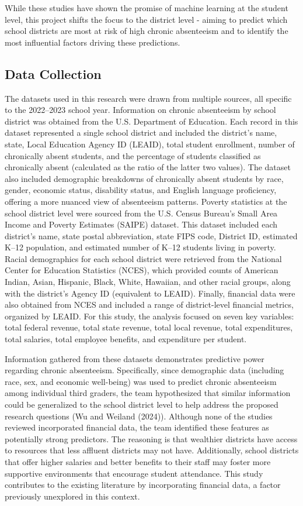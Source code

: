 \documentclass[
  11pt,
]{article}
\begin{document}
While these studies have shown the promise of machine learning at the
student level, this project shifts the focus to the district level -
aiming to predict which school districts are most at risk of high
chronic absenteeism and to identify the most influential factors driving
these predictions.

\subsection{Data Collection}\label{data-collection}

The datasets used in this research were drawn from multiple sources, all
specific to the 2022--2023 school year. Information on chronic
absenteeism by school district was obtained from the U.S. Department of
Education. Each record in this dataset represented a single school
district and included the district's name, state, Local Education Agency
ID (LEAID), total student enrollment, number of chronically absent
students, and the percentage of students classified as chronically
absent (calculated as the ratio of the latter two values). The dataset
also included demographic breakdowns of chronically absent students by
race, gender, economic status, disability status, and English language
proficiency, offering a more nuanced view of absenteeism patterns.
Poverty statistics at the school district level were sourced from the
U.S. Census Bureau's Small Area Income and Poverty Estimates (SAIPE)
dataset. This dataset included each district's name, state postal
abbreviation, state FIPS code, District ID, estimated K--12 population,
and estimated number of K--12 students living in poverty. Racial
demographics for each school district were retrieved from the National
Center for Education Statistics (NCES), which provided counts of
American Indian, Asian, Hispanic, Black, White, Hawaiian, and other
racial groups, along with the district's Agency ID (equivalent to
LEAID). Finally, financial data were also obtained from NCES and
included a range of district-level financial metrics, organized by
LEAID. For this study, the analysis focused on seven key variables:
total federal revenue, total state revenue, total local revenue, total
expenditures, total salaries, total employee benefits, and expenditure
per student.

Information gathered from these datasets demonstrates predictive power
regarding chronic absenteeism. Specifically, since demographic data
(including race, sex, and economic well-being) was used to predict
chronic absenteeism among individual third graders, the team
hypothesized that similar information could be generalized to the school
district level to help address the proposed research questions (Wu and
Weiland (2024)). Although none of the studies reviewed incorporated
financial data, the team identified these features as potentially strong
predictors. The reasoning is that wealthier districts have access to
resources that less affluent districts may not have. Additionally,
school districts that offer higher salaries and better benefits to their
staff may foster more supportive environments that encourage student
attendance. This study contributes to the existing literature by
incorporating financial data, a factor previously unexplored in this
context.
\end{document}
